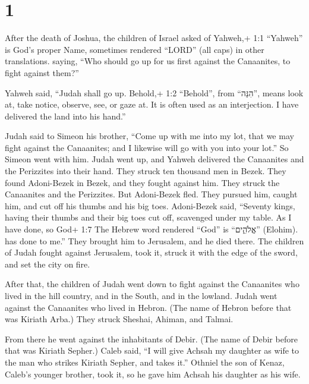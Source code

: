 \hypertarget{section}{%
\section{1}\label{section}}

 After the death of Joshua, the children of Israel asked of
Yahweh,+ 1:1 ``Yahweh'' is God's proper Name, sometimes rendered
``LORD'' (all caps) in other translations. saying, ``Who should go up
for us first against the Canaanites, to fight against them?''

 Yahweh said, ``Judah shall go up. Behold,+ 1:2 ``Behold'',
from ``הִנֵּה'', means look at, take notice, observe, see, or gaze at.
It is often used as an interjection. I have delivered the land into his
hand.''

 Judah said to Simeon his brother, ``Come up with me into my
lot, that we may fight against the Canaanites; and I likewise will go
with you into your lot.'' So Simeon went with him.  Judah
went up, and Yahweh delivered the Canaanites and the Perizzites into
their hand. They struck ten thousand men in Bezek.  They
found Adoni-Bezek in Bezek, and they fought against him. They struck the
Canaanites and the Perizzites.  But Adoni-Bezek fled. They
pursued him, caught him, and cut off his thumbs and his big toes.
 Adoni-Bezek said, ``Seventy kings, having their thumbs and
their big toes cut off, scavenged under my table. As I have done, so
God+ 1:7 The Hebrew word rendered ``God'' is ``אֱלֹהִ֑ים'' (Elohim). has
done to me.'' They brought him to Jerusalem, and he died there.
 The children of Judah fought against Jerusalem, took it,
struck it with the edge of the sword, and set the city on fire.

 After that, the children of Judah went down to fight
against the Canaanites who lived in the hill country, and in the South,
and in the lowland.  Judah went against the Canaanites who
lived in Hebron. (The name of Hebron before that was Kiriath Arba.) They
struck Sheshai, Ahiman, and Talmai.

 From there he went against the inhabitants of Debir. (The
name of Debir before that was Kiriath Sepher.)  Caleb said,
``I will give Achsah my daughter as wife to the man who strikes Kiriath
Sepher, and takes it.''  Othniel the son of Kenaz, Caleb's
younger brother, took it, so he gave him Achsah his daughter as his
wife.

